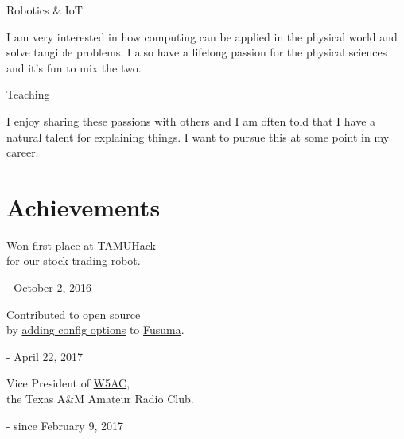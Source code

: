 \documentclass{article}
\newcommand{\jskill}[2]{
\noindent
\begin{minipage}[t]{.15\textwidth}
\hfill #1
\end{minipage}
\hspace{.05em}\vline\hspace{.05em}
\begin{minipage}[t]{.80\textwidth}
#2
\end{minipage}

\vspace{0.75em}}
\begin{document}
\jskill{Robotics \& IoT}{I am very interested in how computing can be applied in the physical world and solve tangible problems. I also have a lifelong passion for the physical sciences and it's fun to mix the two.}

\jskill{Teaching}{I enjoy sharing these passions with others and I am often told that I have a natural talent for explaining things. I want to pursue this at some point in my career.}

\section{Achievements}

\noindent
\begin{minipage}[t]{0.33\textwidth}
Won first place at TAMUHack \\
for \href{https://devpost.com/software/midas-evi574}{our stock trading robot}.

\hfill - October 2, 2016
\end{minipage}\hfill
\begin{minipage}[t]{0.33\textwidth}
Contributed to open source \\
by \href{https://github.com/iberianpig/fusuma/pull/36}{adding config options} to \href{https://github.com/iberianpig/fusuma}{Fusuma}.

\hfill - April 22, 2017
\end{minipage}\hfill
\begin{minipage}[t]{0.33\textwidth}
Vice President of \href{http://w5ac.tamu.edu}{W5AC},  \\
the Texas A\&M Amateur Radio Club.

\hfill - since February 9, 2017
\end{minipage}

\end{document}
